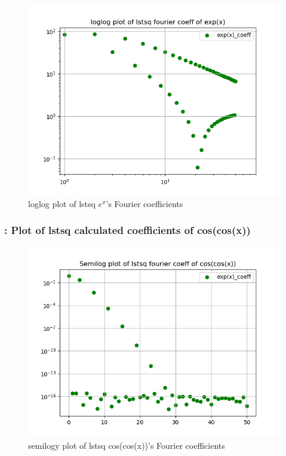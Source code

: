 \documentclass[11pt]{article}
\begin{document}
\begin{figure}[H]
    \centering
    \includegraphics[scale = 0.5]{Figure_8.png}
    \caption{loglog plot of lstsq $e^{x}$'s Fourier coefficients}
\end{figure}

\subsubsection{: Plot of lstsq calculated coefficients of cos(cos(x))}

\begin{figure}[H]
    \centering
    \includegraphics[scale = 0.5]{Figure_9.png}
    \caption{semilogy plot of lstsq cos(cos(x))'s Fourier coefficients}
\end{figure}
\end{document}
